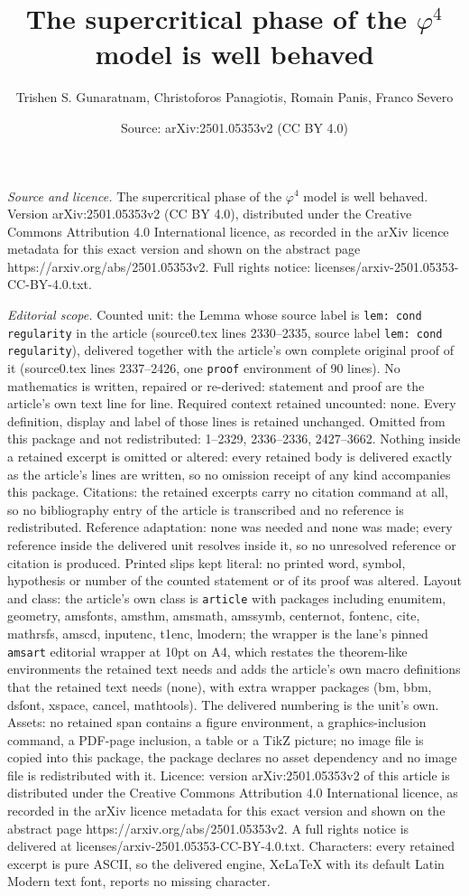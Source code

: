 \documentclass[10pt,a4paper]{amsart}
\title[The supercritical phase of the $\varphi^4$ model is well beh]{The supercritical phase of the $\varphi^4$ model is well behaved}
\author{Trishen S. Gunaratnam, Christoforos Panagiotis, Romain Panis, Franco Severo}
\date{Source: arXiv:2501.05353v2 (CC BY 4.0)}
\begin{document}
\maketitle

\noindent\emph{Source and licence.} The supercritical phase of the $\varphi^4$ model is well behaved. Version arXiv:2501.05353v2 (CC BY 4.0), distributed under the Creative Commons Attribution 4.0 International licence, as recorded in the arXiv licence metadata for this exact version and shown on the abstract page https://arxiv.org/abs/2501.05353v2. Full rights notice: licenses/arxiv-2501.05353-CC-BY-4.0.txt.\par\smallskip

\noindent\textit{Editorial scope.} Counted unit: the Lemma whose source label is \texttt{lem: cond regularity} in the article (source0.tex lines 2330--2335, source label \texttt{lem: cond regularity}), delivered together with the article's own complete original proof of it (source0.tex lines 2337--2426, one \texttt{proof} environment of 90 lines). No mathematics is written, repaired or re-derived: statement and proof are the article's own text line for line. Required context retained uncounted: none. Every definition, display and label of those lines is retained unchanged. Omitted from this package and not redistributed: 1--2329, 2336--2336, 2427--3662. Nothing inside a retained excerpt is omitted or altered: every retained body is delivered exactly as the article's lines are written, so no omission receipt of any kind accompanies this package. Citations: the retained excerpts carry no citation command at all, so no bibliography entry of the article is transcribed and no reference is redistributed. Reference adaptation: none was needed and none was made; every reference inside the delivered unit resolves inside it, so no unresolved reference or citation is produced. Printed slips kept literal: no printed word, symbol, hypothesis or number of the counted statement or of its proof was altered. Layout and class: the article's own class is \texttt{article} with packages including enumitem, geometry, amsfonts, amsthm, amsmath, amssymb, centernot, fontenc, cite, mathrsfs, amscd, inputenc, t1enc, lmodern; the wrapper is the lane's pinned \texttt{amsart} editorial wrapper at 10pt on A4, which restates the theorem-like environments the retained text needs and adds the article's own macro definitions that the retained text needs (none), with extra wrapper packages (bm, bbm, dsfont, xspace, cancel, mathtools). The delivered numbering is the unit's own. Assets: no retained span contains a figure environment, a graphics-inclusion command, a PDF-page inclusion, a table or a TikZ picture; no image file is copied into this package, the package declares no asset dependency and no image file is redistributed with it. Licence: version arXiv:2501.05353v2 of this article is distributed under the Creative Commons Attribution 4.0 International licence, as recorded in the arXiv licence metadata for this exact version and shown on the abstract page https://arxiv.org/abs/2501.05353v2. A full rights notice is delivered at licenses/arxiv-2501.05353-CC-BY-4.0.txt. Characters: every retained excerpt is pure ASCII, so the delivered engine, XeLaTeX with its default Latin Modern text font, reports no missing character.
\end{document}
